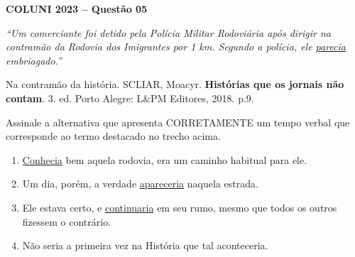 \textbf{COLUNI 2023 -- Questão 05}\par\medskip \textit{“Um comerciante foi detido pela Polícia Militar Rodoviária após dirigir na contramão da Rodovia dos Imigrantes por 1 km. Segundo a polícia, ele \underline{parecia} embriagado.”}

\par

Na contramão da história. SCLIAR, Moacyr. \textbf{Histórias que os jornais não contam}. 3. ed. Porto Alegre: L\&PM Editores, 2018. p.9.

\par

Assinale a alternativa que apresenta CORRETAMENTE um tempo verbal que corresponde ao termo destacado no trecho acima.\begin{enumerate}
\item \underline{Conhecia} bem aquela rodovia, era um caminho habitual para ele.
\item Um dia, porém, a verdade \underline{apareceria} naquela estrada.
\item Ele estava certo, e \underline{continuaria} em seu rumo, mesmo que todos os outros fizessem o contrário.
\item Não seria a primeira vez na História que tal aconteceria.\end{enumerate}
